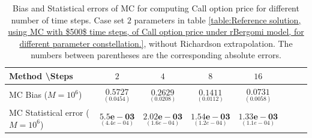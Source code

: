 \documentclass[11pt]{article}
\begin{document}
\begin{table}[h!]
	\centering
	\begin{tabular}{l*{6}{c}r}
		Method \textbackslash  Steps            & $2$ & $4$ & $8$ & $16$  \\
		\hline
		MC Bias ($M=10^6$)   & $\underset{( 0.0454)}{\mathbf{0.5727}}$  & $\underset{ (  0.0208)}{\mathbf{0.2629}}$  & $\underset{(   0.0112)}{\mathbf{0.1411}}$ & $\underset{( 0.0058)}{\mathbf{0.0731}}$  \\	
		
			MC Statistical error ($M=10^6$)  & $\underset{( 4.4e-04)}{\mathbf{5.5e-03}}$  & $\underset{(  1.6e-04)}{\mathbf{2.02e-03}}$  & $\underset{(  1.2e-04)}{\mathbf{1.54e-03}}$ & $\underset{(  1.1e-04)}{\mathbf{1.33e-03}}$ \\	
				
		\hline
	\end{tabular}
	\caption{Bias and Statistical errors of MC  for computing Call option price  for different number of time steps. Case set $2$ parameters in table \ref{table:Reference solution, using MC with $500$ time steps, of Call option price under rBergomi model, for different parameter constellation.}, without Richardson extrapolation. The numbers between parentheses are the corresponding absolute errors.}
	\label{Bias and Statistical errors of MC ($M=10^6$)  for computing Call option price  for different number of time steps. Case set $2$ parameters, without Richardson extrapolation. The numbers between parentheses are the corresponding absolute errors.}
\end{table}
\end{document}
